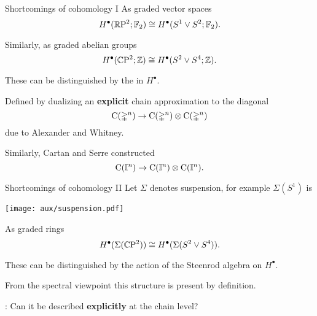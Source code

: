 
\begin{frame}{Shortcomings of cohomology I}
	\pause
	As graded vector spaces
	\[
	H^\bullet(\mathbb{R} \mathrm{P}^2; {\mathbb{F}_2}) \cong H^\bullet(S^1 \vee S^2; {\mathbb{F}_2}).
	\]

	\pause
	Similarly, as graded abelian groups
	\[
	H^\bullet(\mathbb{C} \mathrm{P}^2; \mathbb{Z}) \cong H^\bullet(S^2 \vee S^4; \mathbb{Z}).
	\]

	\pause
	These can be distinguished by the  in $H^\bullet$.

	\bigskip\pause
	Defined by dualizing an \textbf{explicit} chain approximation to the diagonal
	\[
	\operatorname{C}(\mathbb{\Delta}^n) \to \operatorname{C}(\mathbb{\Delta}^n) \otimes \operatorname{C}(\mathbb{\Delta}^n)
	\]
	due to Alexander and Whitney.

	\medskip\pause
	Similarly, Cartan and Serre constructed
	\[
	\operatorname{C}(\mathbb{I}^n) \to \operatorname{C}(\mathbb{I}^n) \otimes \operatorname{C}(\mathbb{I}^n).
	\]
\end{frame}

\begin{frame}[fragile]{Shortcomings of cohomology II}
	\pause
	Let $\Sigma$ denotes suspension, for example $\Sigma(S^1)$ is
	\begin{center}
		\texttt{[image: aux/suspension.pdf]}
	\end{center}

	\pause\vskip-10pt
	As graded rings
	\[
	H^\bullet(\Sigma(\mathbb{C} \mathrm{P}^2)) \cong H^\bullet(\Sigma(S^2 \vee S^4)).
	\]

	\pause
	These can be distinguished by the action of the Steenrod algebra on $H^\bullet$.

	\bigskip\pause
	From the spectral viewpoint this structure is present by definition.

	\bigskip\pause
	: Can it be described \textbf{explicitly} at the chain level?
\end{frame}